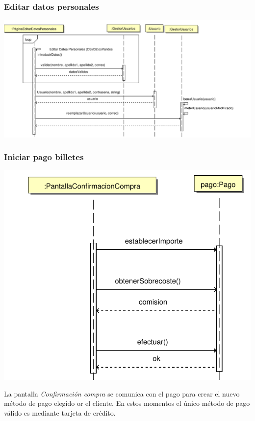 \documentclass[11pt, a4paper, twoside, titlepage]{article}
\begin{document}
			\subsubsection{Editar datos personales}
				\begin{center}
					\includegraphics[scale=.6]{diseno/diagramas/editardatospersonales.pdf}
				\end{center}


			\subsubsection{Iniciar pago billetes}
				\begin{center}
					\includegraphics[scale=.6]{diseno/diagramas/iniciarpagobilletes.pdf}
				\end{center}
				La pantalla {\itshape Confirmación compra} se comunica con el pago para crear el nuevo método de pago elegido or el cliente. En estos momentos el único método de pago válido es mediante tarjeta de crédito.
				
\end{document}
